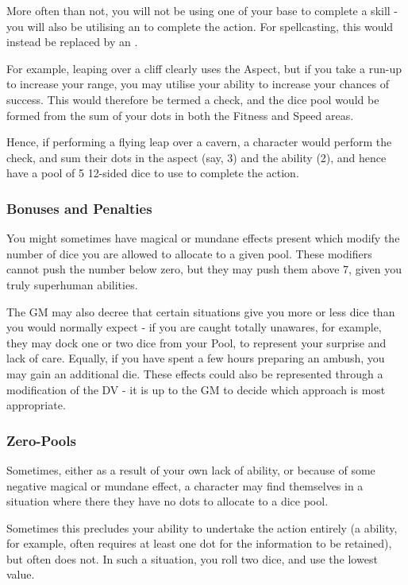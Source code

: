 More often than not, you will not be using one of your base  to complete a skill - you will also be utilising an  to complete the action. For spellcasting, this would instead be replaced by an . 

For example, leaping over a cliff clearly uses the  Aspect, but if you take a run-up to increase your range, you may utilise your  ability to increase your chances of success. This would therefore be termed a  check, and the dice pool would be formed from the sum of your dots in both the Fitness and Speed areas.

Hence, if performing a flying leap over a cavern, a character would perform the  check, and sum their dots in the  aspect (say, 3) and the  ability (2), and hence have a pool of 5 12-sided dice to use to complete the action. 

\subsubsection{Bonuses and Penalties}

You might sometimes have magical or mundane effects present which modify the number of dice you are allowed to allocate to a given pool. These modifiers cannot push the number below zero, but they may push them above 7, given you truly superhuman abilities.

The GM may also decree that certain situations give you more or less dice than you would normally expect - if you are caught totally unawares, for example, they may dock one or two dice from your Pool, to represent your surprise and lack of care. Equally, if you have spent a few hours preparing an ambush, you may gain an additional die. These effects could also be represented through a modification of the DV - it is up to the GM to decide which approach is most appropriate.

\subsubsection{Zero-Pools}

Sometimes, either as a result of your own lack of ability, or because of some negative magical or mundane effect, a character may find themselves in a situation where there they have no dots to allocate to a dice pool. 

Sometimes this precludes your ability to undertake the action entirely (a  ability, for example, often requires at least one dot for the information to be retained), but often does not. In such a situation, you roll two dice, and use the lowest value. 


